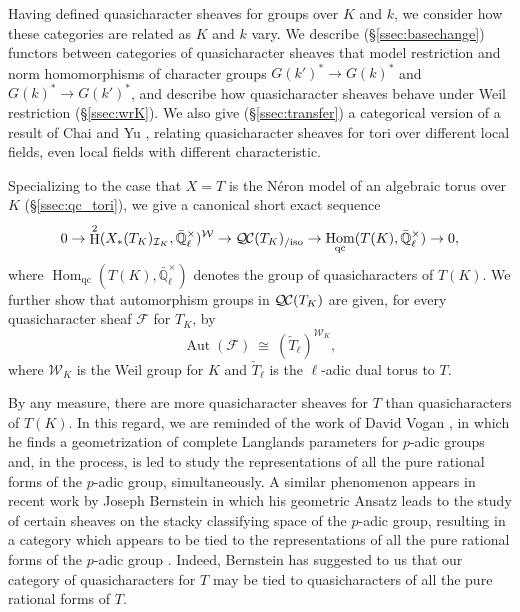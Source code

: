 \documentclass[10pt]{amsart}
\theoremstyle{plain}
\theoremstyle{definition}
\theoremstyle{remark}
\newcommand{\EE}{\mathbb{\bar Q}_\ell}
\newcommand{\Fq}{k}
\newcommand{\EEx}{\EE^\times}
\newcommand{\Weil}[1]{\mathcal{W}_{#1}}
\DeclareMathOperator{\Aut}{Aut}
\DeclareMathOperator{\Hom}{Hom}
\DeclareMathOperator{\Hh}{H}
\newcommand{\iso}{{\ \cong\ }}
\newcommand{\qcs}[1]{{\mathcal{#1}}}
\newcommand{\QC}{{\mathcal{Q\hskip-0.8pt C}}}
\newcommand{\QCiso}[1]{\QC(#1)_{/\text{iso}}}
\begin{document}
Having defined quasicharacter sheaves for groups over $K$ and $\Fq$, we consider how
these categories are related as $K$ and $\Fq$ vary.  We describe (\S\ref{ssec:basechange}) functors between categories
of quasicharacter sheaves that model restriction and norm homomorphisms of character groups $G(k')^* \to G(k)^*$ and $G(k)^* \to G(k')^*$,
and describe how quasicharacter sheaves behave under Weil restriction (\S\ref{ssec:wrK}).  We also give (\S\ref{ssec:transfer})
a categorical version of a result of Chai and Yu \cite{chai-yu:01a},
relating quasicharacter sheaves for tori over different local fields, even local fields
with different characteristic.

Specializing to the case that $X = T$ is the N\'eron model of an algebraic torus over $K$ (\S\ref{ssec:qc_tori}), 
we give a canonical short exact sequence 
\[
0 \to \Hh^2(X_*(T_K)_{\mathcal{I}_K},\EEx)^{\Weil{}} \to \QCiso{T_K} \to \Hom_\text{qc}(T(K),\EEx) \to 0,
\]
where $\Hom_\text{qc}(T(K),\EEx)$ denotes the group of quasicharacters of $T(K)$.
We further show that automorphism groups in $\QC(T_K)$ are given, for every quasicharacter sheaf $\qcs{F}$ for $T_K$, by
\[
\Aut(\qcs{F}) \iso (\check{T}_\ell)^{\Weil{K}},
\]
where $\Weil{K}$ is the Weil group for $K$ and $\check{T}_\ell$ is the $\ell$-adic dual torus to $T$.

By any measure, there are more quasicharacter sheaves for $T$ than quasicharacters of $T(K)$.  
In this regard, we are reminded of the work of David Vogan \cite{vogan:93a}, in which he finds a geometrization of complete Langlands parameters for $p$-adic groups 
and, in the process, is led to study the representations of all the pure rational forms of the $p$-adic group, simultaneously.
A similar phenomenon appears in recent work by Joseph Bernstein in which his geometric Ansatz leads to the study of certain sheaves on the stacky classifying space of the $p$-adic group, resulting in a category which appears to be tied to the representations of all the pure rational forms of the $p$-adic group \cite{bernstein:vogan_conference}.
Indeed, Bernstein has suggested to us that our category of quasicharacters for $T$ may be tied to quasicharacters of all the pure rational forms of $T$.
\end{document}
